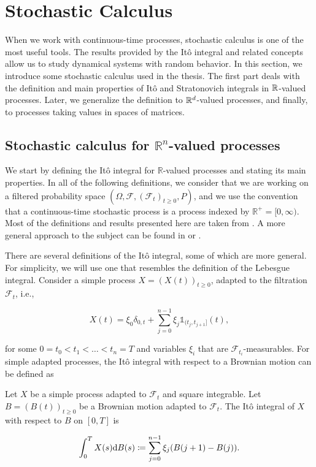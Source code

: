 \section{Stochastic Calculus}

When we work with continuous-time processes, stochastic calculus is one of the most useful tools. The results provided by the Itô integral and related concepts allow us to study dynamical systems with random behavior. In this section, we introduce some stochastic calculus used in the thesis. The first part deals with the definition and main properties of Itô and Stratonovich integrals in $\mathbb R$-valued processes. Later, we generalize the definition to $\mathbb R^d$-valued processes, and finally, to processes taking values in spaces of matrices.

\subsection{Stochastic calculus for $\mathbb{R}^n$-valued processes}

We start by defining the Itô integral for \(\mathbb{R}\)-valued processes and stating its main properties. In all of the following definitions, we consider that we are working on a filtered probability space \((\Omega, \mathscr{F}, (\mathscr{F}_t)_{t \geq 0}, P)\), and we use the convention that a continuous-time stochastic process is a process indexed by \(\mathbb{R}^+ = [0,\infty)\). Most of the definitions and results presented here are taken from \cite{book:klebaner}. A more general approach to the subject can be found in \cite{book:karatzas} or \cite{book:revuzyor}.

There are several definitions of the Itô integral, some of which are more general. For simplicity, we will use one that resembles the definition of the Lebesgue integral. Consider a simple process \(X = (X(t))_{t \geq 0}\), adapted to the filtration \(\mathscr{F}_t\), i.e.,

\begin{equation*}
    X(t) = \xi_0\delta_{0,t} + \sum_{j=0}^{n-1}  \xi_j \mathds 1_{(t_j,t_{j+1}]}(t),
\end{equation*}

\noindent for some $0=t_0 < t_1 < \dots < t_n = T$ and variables $\xi_i$ that are $\mathscr F_{t_i}$-measurables. For simple adapted processes, the Itô integral with respect to a Brownian motion can be defined as


\begin{definition} \label{def:itosimple}
    Let $X$ be a simple process adapted to $\mathscr F_t$ and square integrable. Let $B = (B(t))_{t\ge 0}$ be a Brownian motion adapted to $\mathscr F_t$. The Itô integral of $X$ with respect to $B$ on $[0,T]$ is 

    \begin{equation*}
        \int_0^T X(s) \mathrm d B(s) \coloneqq \sum_{j=0}^{n-1} \xi_j(B(j+1) - B(j)).
    \end{equation*}
\end{definition}

